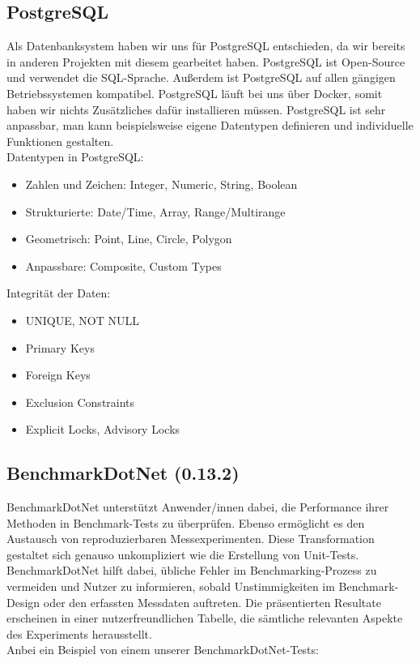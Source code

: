 \subsection*{PostgreSQL}

Als Datenbanksystem haben wir uns für PostgreSQL entschieden, da wir bereits in anderen 
Projekten mit diesem gearbeitet haben. PostgreSQL ist Open-Source und verwendet die SQL-Sprache. 
Außerdem ist PostgreSQL auf allen gängigen Betriebssystemen kompatibel.
PostgreSQL läuft bei uns über Docker, somit haben wir nichts Zusätzliches dafür installieren müssen.
PostgreSQL ist sehr anpassbar, man kann beispielsweise eigene Datentypen 
definieren und individuelle Funktionen gestalten.\\

Datentypen in PostgreSQL:
\begin{itemize}
    \item Zahlen und Zeichen: Integer, Numeric, String, Boolean
    \item Strukturierte: Date/Time, Array, Range/Multirange
    \item Geometrisch: Point, Line, Circle, Polygon
    \item Anpassbare: Composite, Custom Types
\end{itemize}

Integrität der Daten:
\begin{itemize}
    \item UNIQUE, NOT NULL
    \item Primary Keys
    \item Foreign Keys
    \item Exclusion Constraints
    \item Explicit Locks, Advisory Locks
\end{itemize}


\newpage
\subsection*{BenchmarkDotNet (0.13.2)}

BenchmarkDotNet unterstützt Anwender/innen dabei, die Performance ihrer Methoden in 
Benchmark-Tests zu überprüfen. Ebenso ermöglicht es den Austausch von reproduzierbaren 
Messexperimenten. Diese Transformation gestaltet sich genauso unkompliziert wie die 
Erstellung von Unit-Tests. BenchmarkDotNet hilft dabei, übliche Fehler im Benchmarking-Prozess 
zu vermeiden und Nutzer zu informieren, sobald Unstimmigkeiten im Benchmark-Design oder den 
erfassten Messdaten auftreten. Die präsentierten Resultate erscheinen in einer 
nutzerfreundlichen Tabelle, die sämtliche relevanten Aspekte des Experiments herausstellt.\\
Anbei ein Beispiel von einem unserer BenchmarkDotNet-Tests:\\

